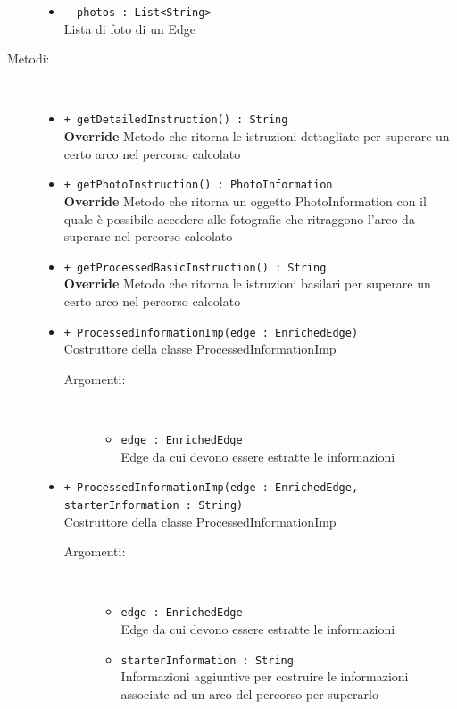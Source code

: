 \documentclass[../DefinizioneDiProdotto.tex]{subfiles}
\begin{document}
\begin{description}
\begin{itemize}
\item \texttt{- photos : List<String>}\\
Lista di foto di un Edge

\end{itemize}
\item[Metodi:] \
\begin{itemize}
\item \texttt{+ getDetailedInstruction() : String}\\
\textbf{Override} Metodo che ritorna le istruzioni dettagliate per superare un certo arco nel percorso calcolato
 \item \texttt{+ getPhotoInstruction() : PhotoInformation}\\
\textbf{Override} Metodo che ritorna un oggetto PhotoInformation con il quale è possibile accedere alle fotografie che ritraggono l'arco da superare nel percorso calcolato
 \item \texttt{+ getProcessedBasicInstruction() : String}\\
\textbf{Override} Metodo che ritorna le istruzioni basilari per superare un certo arco nel percorso calcolato
 \item \texttt{+ ProcessedInformationImp(edge : EnrichedEdge)}\\
Costruttore della classe ProcessedInformationImp
 \begin{description}
\item[Argomenti:] \
\begin{itemize}
\item \texttt{edge : EnrichedEdge}\\
Edge da cui devono essere estratte le informazioni\end{itemize}
\end{description}
\item \texttt{+ ProcessedInformationImp(edge : EnrichedEdge, starterInformation : String)}\\
Costruttore della classe ProcessedInformationImp
 \begin{description}
\item[Argomenti:] \
\begin{itemize}
\item \texttt{edge : EnrichedEdge}\\
Edge da cui devono essere estratte le informazioni\item \texttt{starterInformation : String}\\
Informazioni aggiuntive per costruire le informazioni associate ad un arco del percorso per superarlo\end{itemize}
\end{description}
\end{itemize}
\end{description}
\end{document}
